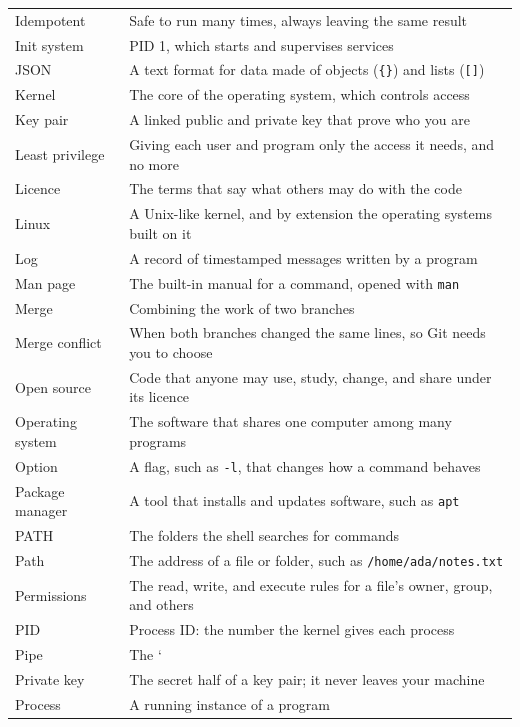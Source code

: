\begin{booktable}
\begin{longtable}{>{\raggedright\arraybackslash}p{}>{\raggedright\arraybackslash}p{}}
Idempotent & Safe to run many times, always leaving the same result \\
Init system & PID 1, which starts and supervises services \\
JSON & A text format for data made of objects (\texttt{\{\}}) and lists
(\texttt{{[}{]}}) \\
Kernel & The core of the operating system, which controls access \\
Key pair & A linked public and private key that prove who you are \\
Least privilege & Giving each user and program only the access it needs, and no more \\
Licence & The terms that say what others may do with the code \\
Linux & A Unix-like kernel, and by extension the operating systems built on it \\
Log & A record of timestamped messages written by a program \\
Man page & The built-in manual for a command, opened with \texttt{man} \\
Merge & Combining the work of two branches \\
Merge conflict & When both branches changed the same lines, so Git needs you to choose \\
Open source & Code that anyone may use, study, change, and share under its licence \\
Operating system & The software that shares one computer among many programs \\
Option & A flag, such as \texttt{-l}, that changes how a command behaves \\
Package manager & A tool that installs and updates software, such as \texttt{apt} \\
PATH & The folders the shell searches for commands \\
Path & The address of a file or folder, such as
\texttt{/}\allowbreak{}\texttt{home/}\allowbreak{}\texttt{ada/}\allowbreak{}\texttt{notes.txt} \\
Permissions & The read, write, and execute rules for a file's owner, group, and others \\
PID & Process ID: the number the kernel gives each process \\
Pipe & The ` \\
Private key & The secret half of a key pair; it never leaves your machine \\
Process & A running instance of a program \\

\end{longtable}
\end{booktable}
